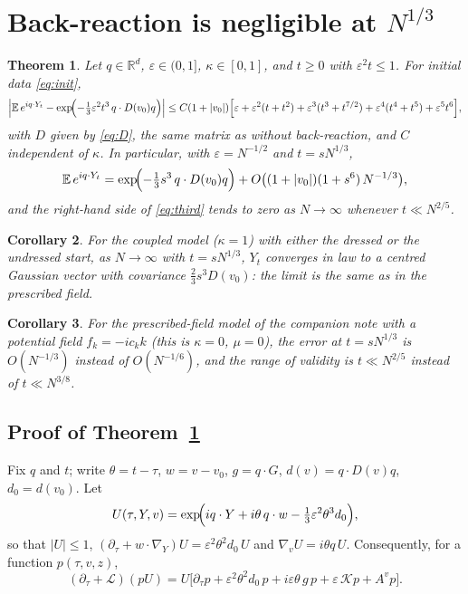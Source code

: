 \documentclass[11pt]{article}
\newcommand{\E}{\mathbb{E}}
\newcommand{\eps}{\varepsilon}
\newcommand{\cL}{\mathcal{L}}
\newcommand{\cK}{\mathcal{K}}
\newtheorem{theorem}{Theorem}
\newtheorem{corollary}[theorem]{Corollary}
\theoremstyle{remark}
\begin{document}
\section{Back-reaction is negligible at \texorpdfstring{$N^{1/3}$}{N\textasciicircum(1/3)}}
\label{sec:third}

\begin{theorem}\label{thm:third}
Let $q\in\mathbb{R}^d$, $\eps\in(0,1]$, $\kappa\in[0,1]$, and $t\ge0$ with
$\eps^2t\le1$. For initial data \eqref{eq:init},
\begin{equation}
  \Bigl|\E\,e^{iq\cdot Y_t}-\exp\!\Bigl(-\tfrac13\eps^2t^3\,q\cdot D(v_0)q\Bigr)\Bigr|
  \le C(1+|v_0|)\Bigl[\eps+\eps^2(t+t^2)+\eps^3(t^3+t^{7/2})
     +\eps^4(t^4+t^5)+\eps^5t^6\Bigr],
  \label{eq:third}
\end{equation}
with $D$ given by \eqref{eq:D}, the same matrix as without back-reaction,
and $C$ independent of $\kappa$. In particular, with $\eps=N^{-1/2}$ and
$t=sN^{1/3}$,
\[
  \E\,e^{iq\cdot Y_t}=\exp\!\Bigl(-\tfrac13s^3\,q\cdot D(v_0)q\Bigr)
   +O\bigl((1+|v_0|)(1+s^6)\,N^{-1/3}\bigr),
\]
and the right-hand side of \eqref{eq:third} tends to zero as $N\to\infty$
whenever $t\ll N^{2/5}$.
\end{theorem}

\begin{corollary}\label{cor:law}
For the coupled model ($\kappa=1$) with either the dressed or the undressed
start, as $N\to\infty$ with $t=sN^{1/3}$, $Y_t$ converges in law to a
centred Gaussian vector with covariance $\tfrac23s^3D(v_0)$: the limit is
the same as in the prescribed field.
\end{corollary}

\begin{corollary}\label{cor:rate}
For the prescribed-field model of the companion note with a potential field
$f_k=-ic_kk$ (this is $\kappa=0$, $\mu=0$), the error at $t=sN^{1/3}$ is
$O(N^{-1/3})$ instead of $O(N^{-1/6})$, and the range of validity is
$t\ll N^{2/5}$ instead of $t\ll N^{3/8}$.
\end{corollary}

\subsection{Proof of Theorem~\ref{thm:third}}

Fix $q$ and $t$; write $\theta=t-\tau$, $w=v-v_0$, $g=q\cdot G$,
$d(v)=q\cdot D(v)q$, $d_0=d(v_0)$. Let
\[
  U(\tau,Y,v)=\exp\!\Bigl(iq\cdot Y+i\theta\,q\cdot w-\tfrac13\eps^2\theta^3d_0\Bigr),
\]
so that $|U|\le1$,
$(\partial_\tau+w\cdot\nabla_Y)U=\eps^2\theta^2d_0\,U$ and
$\nabla_vU=i\theta q\,U$. Consequently, for a function $p(\tau,v,z)$,
\begin{equation}
  (\partial_\tau+\cL)(pU)
  =U\bigl[\partial_\tau p+\eps^2\theta^2d_0\,p+i\eps\theta\,g\,p
     +\eps\,\cK p+A^vp\bigr].
  \label{eq:pU}
\end{equation}
\end{document}
